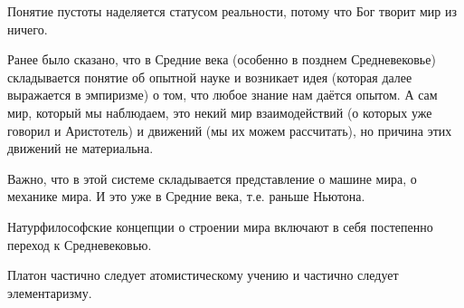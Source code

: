 \documentclass[main.tex]{subfiles}
\begin{document}
Понятие пустоты наделяется статусом реальности, потому что Бог творит мир из ничего.

Ранее было сказано, что в Средние века (особенно в позднем Средневековье) складывается понятие об опытной науке и возникает идея (которая далее выражается в эмпиризме) о том, что любое знание нам даётся опытом.
А сам мир, который мы наблюдаем, это некий мир взаимодействий (о которых уже говорил и Аристотель) и движений (мы их можем рассчитать), но причина этих движений не материальна.

Важно, что в этой системе складывается представление о машине мира, о механике мира.
И это уже в Средние века, т.е. раньше Ньютона.



Натурфилософские концепции о строении мира включают в себя постепенно переход к Средневековью.





Платон частично следует атомистическому учению и частично следует элементаризму.















\end{document}
